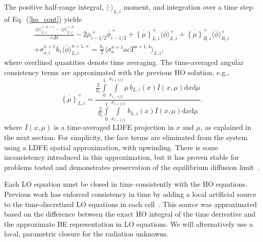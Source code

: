 \documentclass{anstrans}
\renewcommand{\eqref}[1]{(\ref{#1})}
\renewcommand{\d}{\mathrm{d}}
\newcommand{\mom}[1]{\langle #1 \rangle}
\newcommand{\xl}{{x_{i-1/2}}}
\newcommand{\xr}{{x_{i+1/2}}}
\newcommand{\phibar}{\ensuremath{\overline{\phi}}}
\newcommand{\cur}[1]{\left\{ #1 \right\}}
\begin{document}
The positive half-range integral, $\mom{\cdot}_{L,i}$ moment, and
integration over a time step of Eq.~\eqref{ho_cont} yields
\begin{multline}\label{eq:t_moml_ex}
    \frac{\mom{\phi}_{L,i}^{+,n+1} - \mom{\phi}_{L,i}^{+,n}}{c \Delta t}
    -2\overline {\mu}_{i-1/2}^{\,+} \overline \phi_{i-1/2}^{\,+} + \overline{\cur {\mu}}_{L,i}^{+}
  \mom{\phibar}_{L,i}^{+}
  +  \overline{\cur\mu}_{R,i}^{+}
  \mom{\phibar}_{R,i}^{+} \\ +  \sigma_{a,i}^{n+1} h_i 
  \mom{\overline\phi}_{L,i}^{n+1,+}   = \frac{h_i}{2} \mom{\sigma_a^{n+1} a c T^{n+1,4}}_{L,i},
\end{multline}
where overlined quantities denote time averaging.  The time-averaged angular consistency
terms are approximated with the previous HO solution, e.g.,
\begin{equation}\label{const}
    \overline{\cur{{\mu}}}_{L,i}^+ =  \frac{
        {\displaystyle \frac{2}{h_i}} \int\limits_0^1 \int\limits_\xl^\xr \mu \, b_{L,i}(x)
        \overline{I}(x,\mu) \d x \d \mu } 
{{\displaystyle \frac{2}{h_i}} \int\limits_0^1 \int\limits_\xl^\xr \, b_{L,i}(x)
\overline{I}(x,\mu) \d x \d \mu } .
\end{equation}
where $\overline{I}(x,\mu)$ is a time-averaged LDFE projection in $x$ and $\mu$, as
explained in the next section.  For simplicity, the face terms are eliminated from the system using a LDFE
spatial approximation, with upwinding.  There is some inconsistency introduced in this approximation, but
it has proven stable for problems tested and demonstrates preservation of the equilibrium diffusion
limit~\cite{morel_ldtrt}.

Each LO equation must be closed in time consistently with the HO
equations.   Previous work has enforced
consistency in time by adding a local artificial source to the time-discretized LO
equations in each cell~\cite{holo_rh}.  This
source was approximated based on the difference between the exact HO integral of the time
derivative and the approximate BE representation in LO equations. We will alternatively use a
local, parametric closure for the radiation unknowns. 
\end{document}

